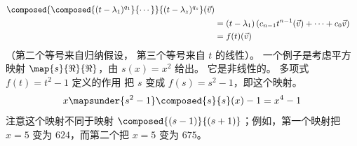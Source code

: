 \begin{exercises}
\begin{answer}
\begin{exparts}
\begin{align*}
{                  \composed{\composed{(t-\lambda_1)^{q_1}}{\cdots}}{
                  (t-\lambda_z)^{q_z}} }
                          (\vec{v})    \\
               &=
               (t-\lambda_1)\,(c_{n-1}t^{n-1}(\vec{v})+\cdots+c_0\vec{v}) \\
               &=
               f(t)(\vec{v})
            \end{align*}
           （第二个等号来自归纳假设， 
           第三个等号来自 \( t \) 的线性）。
         \partsitem 一个例子是考虑平方映射
            $\map{s}{\Re}{\Re}$，由 $s(x)=x^2$ 给出。
            它是非线性的。
            多项式 $f(t)=t^2-1$ 定义的作用 
            把 $s$ 变成 $f(s)=s^2-1$，即这个映射。
            \begin{equation*} 
              x\mapsunder{s^2-1} \composed{s}{s}(x)-1=x^4-1
            \end{equation*}
            注意这个映射不同于映射
            $\composed{(s-1)}{(s+1)}$；例如，第一个映射把
            $x=5$ 变为 $624$，而第二个把 $x=5$ 变为 $675$。
       \end{exparts} 
     \end{answer}

\end{exercises}
